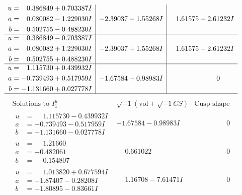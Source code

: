 \documentclass[1p]{elsarticle_modified}
\theoremstyle{definition}
\newcommand{\I}{\sqrt{-1}}
\begin{document}
$$\begin{array}{c|c|c}
\begin{aligned}
u &= \phantom{-}0.386849 + 0.703387 I \\
a &= \phantom{-}0.080082 - 1.229030 I \\
b &= \phantom{-}0.502755 - 0.488230 I\end{aligned}
 & -2.39037 - 1.55268 I & \phantom{-}1.61575 + 2.61232 I \\ \hline\begin{aligned}
u &= \phantom{-}0.386849 - 0.703387 I \\
a &= \phantom{-}0.080082 + 1.229030 I \\
b &= \phantom{-}0.502755 + 0.488230 I\end{aligned}
 & -2.39037 + 1.55268 I & \phantom{-}1.61575 - 2.61232 I \\ \hline\begin{aligned}
u &= \phantom{-}1.115730 + 0.439932 I \\
a &= -0.739493 + 0.517959 I \\
b &= -1.131660 + 0.027778 I\end{aligned}
 & -1.67584 + 0.98983 I & \phantom{-0.000000 } 0\\
 \hline 
 \end{array}$$\newpage$$\begin{array}{c|c|c}  
\text{Solutions to }I^u_{1}& \I (\text{vol} + \sqrt{-1}CS) & \text{Cusp shape}\\
 \hline 
\begin{aligned}
u &= \phantom{-}1.115730 - 0.439932 I \\
a &= -0.739493 - 0.517959 I \\
b &= -1.131660 - 0.027778 I\end{aligned}
 & -1.67584 - 0.98983 I & \phantom{-0.000000 } 0 \\ \hline\begin{aligned}
u &= \phantom{-}1.21660\phantom{ +0.000000I} \\
a &= -0.482061\phantom{ +0.000000I} \\
b &= \phantom{-}0.154807\phantom{ +0.000000I}\end{aligned}
 & \phantom{-}0.661022\phantom{ +0.000000I} & \phantom{-0.000000 } 0 \\ \hline\begin{aligned}
u &= \phantom{-}1.013820 + 0.677594 I \\
a &= -1.87407 - 0.28208 I \\
b &= -1.80895 - 0.83661 I\end{aligned}
 & \phantom{-}1.16708 - 7.61471 I & \phantom{-0.000000 } 0 \\ \hline\begin{aligned}

\end{aligned}
\end{array}$$
\end{document}
